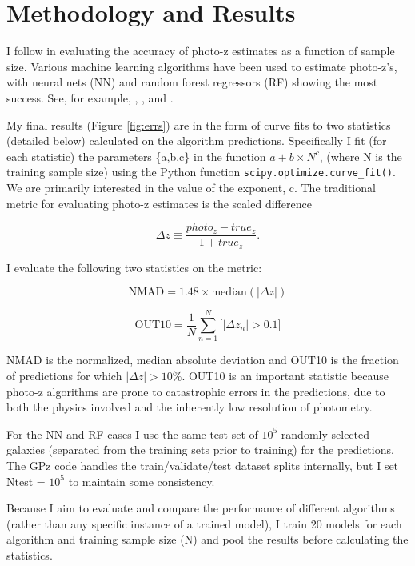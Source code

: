 \documentclass[13pt]{amsart}
\newcommand{\nequ}[2]{\begin{equation}#1 \label{#2}\end{equation}}
\newcommand{\equin}[1]{\(#1\)}
\begin{document}
\section{Methodology and Results}

  I follow \cite{newman} in evaluating the accuracy of photo-z estimates as a function of sample size. Various machine learning algorithms have been used to estimate photo-z's, with neural nets (NN) and random forest regressors (RF) showing the most success. See, for example, \cite{pzreview}, \cite{annz2}, and \cite{tpz}.

  My final results (Figure \ref{fig:errs}) are in the form of curve fits to two statistics (detailed below) calculated on the algorithm predictions. Specifically I fit (for each statistic) the parameters \{a,b,c\} in the function
  \equin{a+b \times N^c},
  (where N is the training sample size) using the Python function \texttt{scipy.optimize.curve\_fit()}. We are primarily interested in the value of the exponent, c.
  The traditional metric for evaluating photo-z estimates is the scaled difference

  \nequ{\Delta z \equiv \frac{photo_z-true_z}{1+true_z}.}{equ:deltaz}

  I evaluate the following two statistics on the metric:

  \nequ{\textrm{NMAD} = 1.48 \times \textrm{median}(|\Delta z|)}{equ:nmad}

  \nequ{\textrm{OUT10} = \frac{1}{N} \sum_{n=1}^N \big[ | \Delta z_n | > 0.1 \big]}{equ:out10}

  NMAD is the normalized, median absolute deviation and OUT10 is the fraction of predictions for which \equin{|\Delta z| > 10\%}. OUT10 is an important statistic because photo-z algorithms are prone to catastrophic errors in the predictions, due to both the physics involved and the inherently low resolution of photometry.

  For the NN and RF cases I use the same test set of $10^5$ randomly selected galaxies (separated from the training sets prior to training) for the predictions. The GPz code handles the train/validate/test dataset splits internally, but I set Ntest = $10^5$ to maintain some consistency.

  Because I aim to evaluate and compare the performance of different algorithms (rather than any specific instance of a trained model), I train 20 models for each algorithm and training sample size (N) and pool the results before calculating the statistics.
\end{document}
